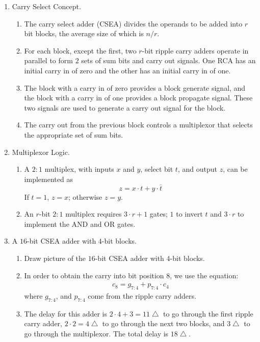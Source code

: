 \documentclass[times, twocolumn, 10pt]{article}
\begin{document}
\begin{enumerate}
\item Carry Select Concept. 
  \begin{enumerate}
  \item The carry select adder (CSEA) divides the operands to be added into
  $r$ bit 
    blocks, the average size of which is $n/r$. 
  \item For each block, except the first, two $r$-bit ripple carry adders
  operate
    in parallel to form $2$ sets of sum bits and carry out signals. One RCA 
    has an initial carry in of zero and the other has an initial carry 
    in of one.    
  \item The block with a carry in of zero provides a block generate signal, and
    the block with a carry in of one provides a block propagate signal. These
    two signals are used to generate a carry out signal for the block. 
  \item The carry out from the previous block controls a multiplexor that
  selects
    the appropriate set of sum bits. 
  \end{enumerate}
\item Multiplexor Logic. 
  \begin{enumerate}
  \item A $2:1$ multiplex, with inputs $x$ and $y$, select bit $t$, and output
  $z$, can be implemented as
    \[	z = x \cdot t + y \cdot \overline{t} \]
    If $t = 1$, $z = x$; otherwise $z = y$. 
  \item An $r$-bit $2:1$ multiplex requires $3 \cdot r + 1$ gates; $1$ to
  invert $t$ and $3 \cdot r$ 
    to implement the AND and OR gates. 
  \end{enumerate}
\item A $16$-bit CSEA adder with $4$-bit blocks. 
  \begin{enumerate}
  \item Draw picture of the $16$-bit CSEA adder with $4$-bit blocks. 
  \item In order to obtain the carry into bit position $8$, we use the 
    equation:
    \begin{eqnarray*}
      c_{8} = g_{7:4} + p_{7:4} \cdot c_{4} 
    \end{eqnarray*}
    where $g_{7:4}$, and $p_{7:4}$ come from the ripple carry adders. 
  \item The delay for this adder is $2 \cdot 4 + 3 = 11 \bigtriangleup$ to 
    go through the first ripple carry adder, $2 \cdot 2 = 4 \bigtriangleup$
    to go 
    through the next two blocks, and $3 \bigtriangleup$ to go through the
    multiplexor. The total delay is $18 \bigtriangleup$. 

\end{enumerate}
\end{enumerate}
\end{document}
